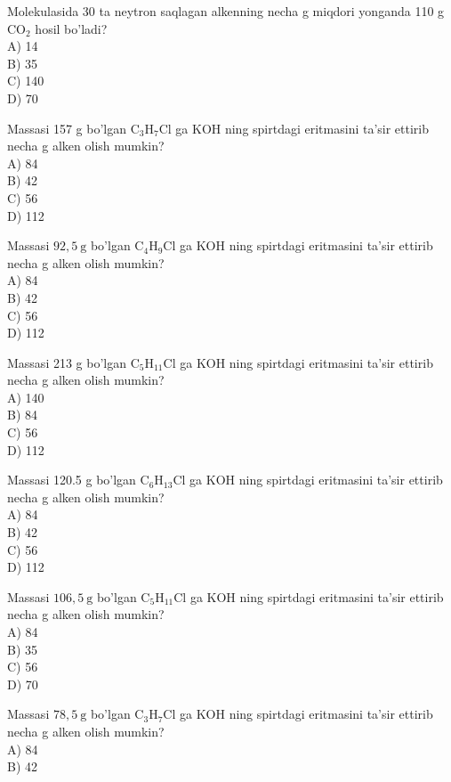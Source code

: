   \item Molekulasida 30 ta neytron saqlagan alkenning necha g miqdori yonganda 110 g $\mathrm{CO}_{2}$ hosil bo'ladi?\\
A) 14\\
B) 35\\
C) 140\\
D) 70
  \item Massasi 157 g bo'lgan $\mathrm{C}_{3} \mathrm{H}_{7} \mathrm{Cl}$ ga KOH ning spirtdagi eritmasini ta'sir ettirib necha g alken olish mumkin?\\
A) 84\\
B) 42\\
C) 56\\
D) 112
  \item Massasi $92,5 \mathrm{~g}$ bo'lgan $\mathrm{C}_{4} \mathrm{H}_{9} \mathrm{Cl}$ ga KOH ning spirtdagi eritmasini ta'sir ettirib necha g alken olish mumkin?\\
A) 84\\
B) 42\\
C) 56\\
D) 112
  \item Massasi 213 g bo'lgan $\mathrm{C}_{5} \mathrm{H}_{11} \mathrm{Cl}$ ga KOH ning spirtdagi eritmasini ta'sir ettirib necha g alken olish mumkin?\\
A) 140\\
B) 84\\
C) 56\\
D) 112
  \item Massasi 120.5 g bo'lgan $\mathrm{C}_{6} \mathrm{H}_{13} \mathrm{Cl}$ ga KOH ning spirtdagi eritmasini ta'sir ettirib necha g alken olish mumkin?\\
A) 84\\
B) 42\\
C) 56\\
D) 112
  \item Massasi $106,5 \mathrm{~g}$ bo'lgan $\mathrm{C}_{5} \mathrm{H}_{11} \mathrm{Cl}$ ga KOH ning spirtdagi eritmasini ta'sir ettirib necha g alken olish mumkin?\\
A) 84\\
B) 35\\
C) 56\\
D) 70
  \item Massasi $78,5 \mathrm{~g}$ bo'lgan $\mathrm{C}_{3} \mathrm{H}_{7} \mathrm{Cl}$ ga KOH ning spirtdagi eritmasini ta'sir ettirib necha g alken olish mumkin?\\
A) 84\\
B) 42\\
